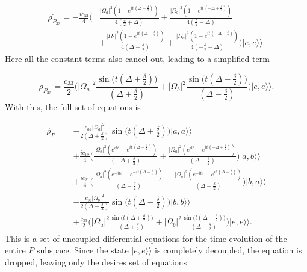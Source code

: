 \documentclass[12pt]{article}
\newcommand{\superket}[1]{|#1\rangle\rangle}
\begin{document}
\begin{align}
    \dot{\rho_{P_{33}}} = -\frac{ic_{33}}{4}\Bigg(&\frac{  |\Omega_a|^2 ( 1-{{ e}^{ i t\, (\Delta+ \frac{\delta }{2} ) }}) }{4 ( \frac{\delta }{2}+\Delta ) }+\frac{  |\Omega_b|^2 ( 1-{{ e}^{ i t\, (-\Delta+ \frac{\delta }{2} ) }}) }{4 ( \frac{\delta }{2}-\Delta ) }\\
    &+\frac{  |\Omega_b|^2 ( 1-{{ e}^{ i t\, ( \Delta -\frac{\delta }{2}) }}) }{4 ( \Delta -\frac{\delta }{2}) }+\frac{  |\Omega_a|^2 ( 1-{{ e}^{ i t\, (-\Delta -\frac{\delta }{2} ) }}) }{4 ( -\frac{\delta }{2}-\Delta ) }\Bigg)\superket{e,e}.\nonumber
\end{align} Here all the constant terms also cancel out, leading to a simplified term

\begin{equation}
     \dot{\rho_{P_{33}}} = \frac{c_{33}}{2}\Bigg(|\Omega_a|^2 \frac{\sin\big(t(\Delta+\frac{\delta}{2})\big)}{(\Delta+\frac{\delta}{2})} + |\Omega_b|^2 \frac{\sin\big(t(\Delta-\frac{\delta}{2})\big)}{(\Delta-\frac{\delta}{2})} \Bigg)\superket{e,e}.
\end{equation} With this, the full set of equations is

\begin{align}
\dot{\rho_P} =& -\frac{c_{aa}|\Omega_a|^2}{2(\Delta + \frac{\delta}{2})}\sin{\big( t(\Delta+\frac{\delta}{2})\big)}\superket{a,a}\\
&+\frac{i{c_{\ensuremath{\mathrm{12}}}}}{4}\Bigg(\frac{ |\Omega_b|^2 ( {{ e}^{ i t \delta }}-{{ e}^{ i t\, ( \Delta+\frac{\delta }{2} ) }}) }{ ( -\Delta + \frac{\delta}{2}  )  }+\frac{|\Omega_a|^2( {{ e}^{ i t \delta }}-{{ e}^{ i t\, (-\Delta+ \frac{\delta }{2} ) }}) }{ ( \Delta + \frac{\delta}{2}) }\Bigg)\superket{a,b}\nonumber\\
&+\frac{i{c_{\ensuremath{\mathrm{21}}}}}{4}\Bigg(\frac{ |\Omega_b|^2 ( {{ e}^{ -i t \delta }}-{{ e}^{ -i t ( \Delta+\frac{\delta }{2} ) }}) }{ ( \Delta - \frac{\delta}{2}  )  }+\frac{|\Omega_a|^2( {{ e}^{ -i t \delta }}-{{ e}^{ i t\, (\Delta- \frac{\delta }{2} ) }}) }{ ( \Delta + \frac{\delta}{2}) }\Bigg)\superket{b,a}\nonumber\\
&-\frac{c_{bb}|\Omega_b|^2}{2(\Delta - \frac{\delta}{2})}\sin{\big( t(\Delta-\frac{\delta}{2})\big)}\superket{b,b}\nonumber\\
&+\frac{c_{33}}{2}\Bigg(|\Omega_a|^2 \frac{\sin\big(t(\Delta+\frac{\delta}{2})\big)}{(\Delta+\frac{\delta}{2})} + |\Omega_b|^2 \frac{\sin\big(t(\Delta-\frac{\delta}{2})\big)}{(\Delta-\frac{\delta}{2})} \Bigg)\superket{e,e}.\nonumber
\end{align} This is a set of uncoupled differential equations for the time evolution of the entire $P$ subspace. Since the state $\superket{e,e}$ is completely decoupled, the equation is dropped, leaving only the desires set of equations
\end{document}
